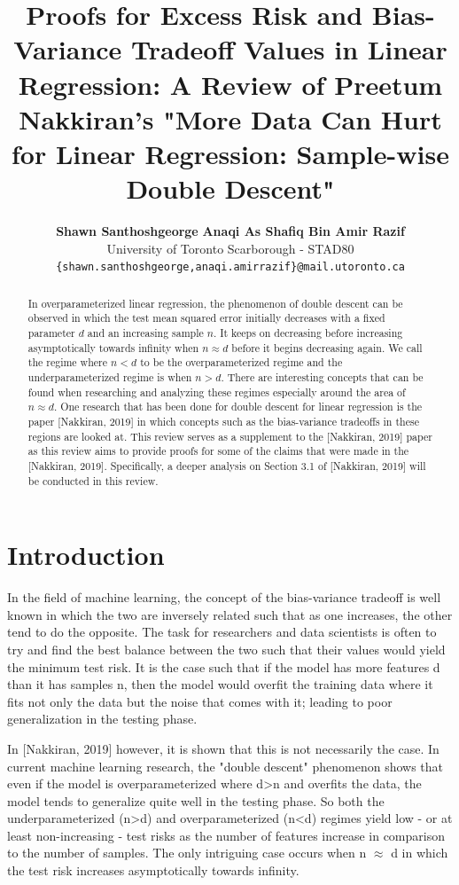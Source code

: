 \documentclass{article}
\title{
    Proofs for Excess Risk and Bias-Variance Tradeoff Values in Linear Regression: A Review of 
    Preetum Nakkiran's "More Data Can Hurt for Linear Regression: Sample-wise Double Descent"
}
\author{%
    \textbf{Shawn Santhoshgeorge} \quad \textbf{Anaqi As Shafiq Bin Amir Razif} \\
    University of Toronto Scarborough - STAD80 \\
    \texttt{\{shawn.santhoshgeorge,anaqi.amirrazif\}@mail.utoronto.ca}
}
\begin{document}
\maketitle

\begin{abstract}
    In overparameterized linear regression, the phenomenon of double descent can be observed in which the test mean squared error initially decreases with a fixed parameter $d$ and an increasing sample $n$. It keeps on decreasing before increasing asymptotically towards infinity when $n \approx d$ before it begins decreasing again. We call the regime where $n<d$ to be the overparameterized regime and the underparameterized regime is when $n > d$. There are interesting concepts that can be found when researching and analyzing these regimes especially around the area of $n \approx d$. One research that has been done for double descent for linear regression is the paper [Nakkiran, 2019] in which concepts such as the bias-variance tradeoffs in these regions are looked at. This review serves as a supplement to the [Nakkiran, 2019] paper as this review aims to provide proofs for some of the claims that were made in the [Nakkiran, 2019]. Specifically, a deeper analysis on Section 3.1 of [Nakkiran, 2019] will be conducted in this review.
\end{abstract}
\section{Introduction}

In the field of machine learning, the concept of the bias-variance tradeoff is well known in which the two are inversely related such that as one increases, the other tend to do the opposite. The task for researchers and data scientists is often to try and find the best balance between the two such that their values would yield the minimum test risk. It is the case such that if the model has more features d than it has samples n, then the model would overfit the training data where it fits not only the data but the noise that comes with it; leading to poor generalization in the testing phase.

In [Nakkiran, 2019] however, it is shown that this is not necessarily the case. In current machine learning research, the "double descent" phenomenon shows that even if the model is overparameterized where d>n and overfits the data, the model tends to generalize quite well in the testing phase. So both the underparameterized (n>d) and overparameterized (n<d) regimes yield low - or at least non-increasing - test risks as the number of features increase in comparison to the number of samples. The only intriguing case occurs when n $\approx$ d in which the test risk increases asymptotically towards infinity. 
\end{document}
